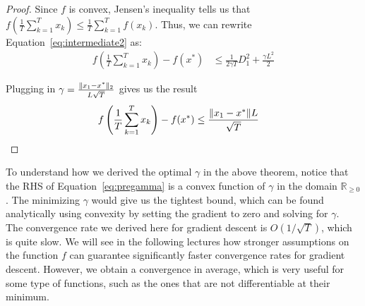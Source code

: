 \documentclass{article}
\newcommand{\R}{\mathbb{R}}
\DeclarePairedDelimiter{\norm}{\lVert}{\rVert}
\begin{document}
\begin{proof}
Since $f$ is convex, Jensen's inequality tells us that $f\left(\frac{1}{T}\sum_{k=1}^T x_k\right) \leq \frac{1}{T}\sum_{k=1}^T f(x_k)$. Thus, we can rewrite Equation~\ref{eq:intermediate2} as:
\begin{align}
f\left(\frac{1}{T}\sum_{k=1}^T x_k\right)-f(x^\ast) &\leq \frac{1}{2\gamma T} D_1^2 + \frac{\gamma L^2}{2} \label{eq:pregamma}
\end{align}

Plugging in $\gamma=\frac{\norm{x_1 - x^\ast}_2}{L \sqrt{T}}$ gives us the result
\begin{align*}
f\left(\frac{1}{T}\sum_{k=1}^T x_k\right) - f(x^\ast) &\leq \frac{\norm{x_1 - x^\ast}L}{\sqrt{T}}
\end{align*}
\end{proof}

To understand how we derived the optimal $\gamma$ in the above theorem, notice that the RHS of Equation~\ref{eq:pregamma} is a convex function of $\gamma$ in the domain $\R_{\geq 0}$. The minimizing $\gamma$ would give us the tightest bound, which can be found analytically using convexity by setting the gradient to zero and solving for $\gamma$.\\

The convergence rate we derived here for gradient descent is $O(1/\sqrt{T})$, which is quite slow. We will see in the following lectures how stronger assumptions on the function $f$ can guarantee significantly faster convergence rates for gradient descent. However, we obtain a convergence in average, which is very useful for some type of functions, such as the ones that are not differentiable at their minimum.








\end{document}
